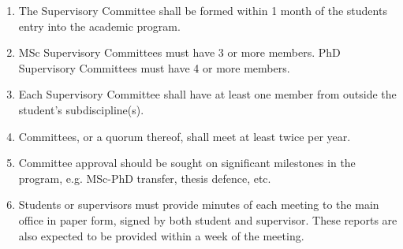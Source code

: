 \documentclass[12pt]{article}
\newcommand\eg{e.g.\xspace}
\newcommand\etc{etc.\xspace}
\newcommand{\supcom}{Supervisory Committee\xspace}
\begin{document}
\begin{enumerate}

    \item The \supcom shall be formed within 1 month of the students entry into
        the academic program.

    \item MSc {\supcom}s must have 3 or more members. PhD {\supcom}s must
        have 4 or more members.

    \item Each \supcom shall have at least one member from outside the
        student's subdiscipline(s).

    \item Committees, or a quorum thereof, shall meet at least twice per year.

    \item Committee approval should be sought on significant milestones in the
        program, \eg MSc-PhD transfer, thesis defence, \etc

    \item Students or supervisors must provide minutes of each meeting to the
        main office in paper form, signed by both student and supervisor.
        These reports are also expected to be provided within a week of the
        meeting.

\end{enumerate}
\end{document}
